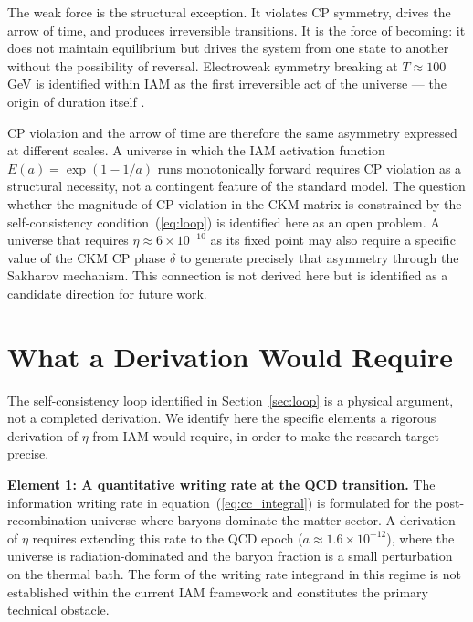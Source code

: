 \documentclass[12pt,a4paper]{article}
\begin{document}
The weak force is the structural exception. It violates CP symmetry,
drives the arrow of time, and produces irreversible transitions. It is
the force of becoming: it does not maintain equilibrium but drives
the system from one state to another without the possibility of
reversal. Electroweak symmetry breaking at $T \approx 100$ GeV is
identified within IAM as the first irreversible act of the universe —
the origin of duration itself \citep{mahaffey2026_higgs}.

CP violation and the arrow of time are therefore the same asymmetry
expressed at different scales. A universe in which the IAM activation
function $E(a) = \exp(1 - 1/a)$ runs monotonically forward requires CP
violation as a structural necessity, not a contingent feature of the
standard model. The question whether the magnitude of CP violation in
the CKM matrix \citep{kobayashi1973} is constrained by the
self-consistency condition~(\ref{eq:loop}) is identified here as an
open problem. A universe that requires $\eta \approx 6 \times 10^{-10}$
as its fixed point may also require a specific value of the CKM CP
phase $\delta$ to generate precisely that asymmetry through the Sakharov
mechanism. This connection is not derived here but is identified as a
candidate direction for future work.

\section{What a Derivation Would Require}
\label{sec:derivation}

The self-consistency loop identified in Section~\ref{sec:loop} is a
physical argument, not a completed derivation. We identify here the
specific elements a rigorous derivation of $\eta$ from IAM would require,
in order to make the research target precise.

\textbf{Element 1: A quantitative writing rate at the QCD transition.}
The information writing rate in equation~(\ref{eq:cc_integral}) is
formulated for the post-recombination universe where baryons dominate
the matter sector. A derivation of $\eta$ requires extending this rate
to the QCD epoch ($a \approx 1.6 \times 10^{-12}$), where the universe
is radiation-dominated and the baryon fraction is a small perturbation
on the thermal bath. The form of the writing rate integrand in this
regime is not established within the current IAM framework and
constitutes the primary technical obstacle.
\end{document}

